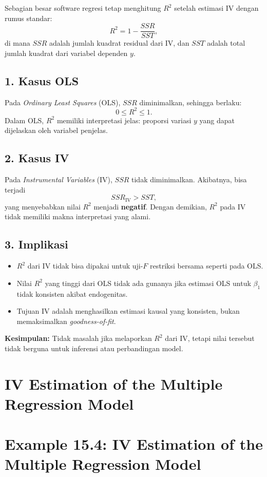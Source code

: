 \documentclass[]{article}
\begin{document}
Sebagian besar software regresi tetap menghitung $R^2$ setelah estimasi IV 
dengan rumus standar:
\[
R^2 = 1 - \frac{SSR}{SST},
\]
di mana $SSR$ adalah jumlah kuadrat residual dari IV, dan $SST$ adalah total 
jumlah kuadrat dari variabel dependen $y$.

\subsection*{1. Kasus OLS}
Pada \textit{Ordinary Least Squares} (OLS), $SSR$ diminimalkan, sehingga berlaku:
\[
0 \leq R^2 \leq 1.
\]
Dalam OLS, $R^2$ memiliki interpretasi jelas: proporsi variasi $y$ yang dapat 
dijelaskan oleh variabel penjelas.

\subsection*{2. Kasus IV}
Pada \textit{Instrumental Variables} (IV), $SSR$ tidak diminimalkan.  
Akibatnya, bisa terjadi
\[
SSR_{\text{IV}} > SST,
\]
yang menyebabkan nilai $R^2$ menjadi \textbf{negatif}.  
Dengan demikian, $R^2$ pada IV tidak memiliki makna interpretasi yang alami.

\subsection*{3. Implikasi}
\begin{itemize}
    \item $R^2$ dari IV tidak bisa dipakai untuk uji-$F$ restriksi bersama seperti pada OLS.
    \item Nilai $R^2$ yang tinggi dari OLS tidak ada gunanya jika estimasi OLS untuk $\beta_1$ tidak konsisten akibat endogenitas.
    \item Tujuan IV adalah menghasilkan estimasi kausal yang konsisten, bukan memaksimalkan \textit{goodness-of-fit}.
\end{itemize}

\noindent
\textbf{Kesimpulan:} Tidak masalah jika melaporkan $R^2$ dari IV, 
tetapi nilai tersebut tidak berguna untuk inferensi atau perbandingan model.

\section{IV Estimation of the Multiple Regression Model}
\section*{Example 15.4: IV Estimation of the Multiple Regression Model}
 
\end{document}
